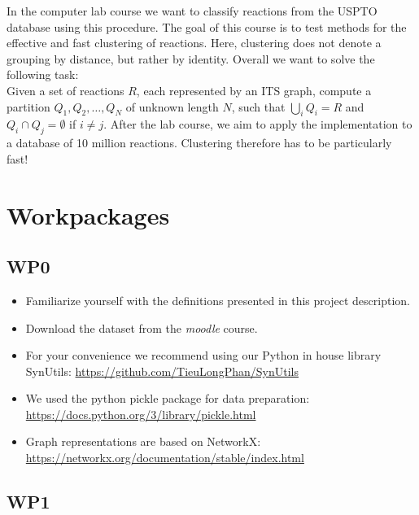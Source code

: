 \documentclass[a4,12pt]{article}
\theoremstyle{plain}
\numberwithin{theorem}{section}
\begin{document}
In the computer lab course we want to classify reactions from the USPTO database using this procedure. The goal of this course is to test methods for the effective and fast clustering of reactions. Here, clustering does not denote a grouping by distance, but rather by identity. Overall we want to solve the following task:\\
Given a set of reactions $R$, each represented by an ITS graph, compute a partition $Q_1, Q_2, \ldots, Q_N$ of unknown length $N$, such that $\bigcup\limits_i Q_i = R$ and $Q_i \cap Q_j = \emptyset$ if $i \neq j$. After the lab course, we aim to apply the implementation to a database of 10 million reactions. Clustering therefore has to be particularly fast!\\

\FloatBarrier

\section{Workpackages}\label{sec:workpackage}

\subsection{WP0}

\begin{itemize}
  \item Familiarize yourself with the definitions presented in this project description.
  \item Download the dataset from the \textit{moodle} course.
  \item For your convenience we recommend using our Python in house library SynUtils: \url{https://github.com/TieuLongPhan/SynUtils}
  \item We used the python pickle package for data preparation: \url{https://docs.python.org/3/library/pickle.html}
  \item Graph representations are based on NetworkX: \url{https://networkx.org/documentation/stable/index.html}
\end{itemize}

\subsection{WP1}
\end{document}
